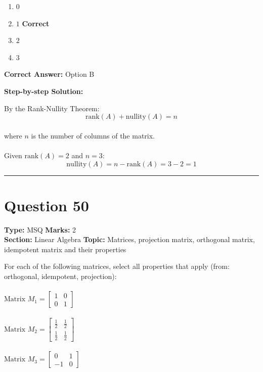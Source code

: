 \documentclass[11pt]{article}
\begin{document}
\begin{enumerate}[label=\textbf{\Alph*.}, leftmargin=1.8em]
\item \(0\)\item \(1\) \hfill {\color{gategreen}\textbf{Correct}}\item \(2\)\item \(3\)\end{enumerate}

\textbf{Correct Answer:} Option B

\textbf{Step-by-step Solution:}

By the Rank-Nullity Theorem:\\
\[\text{rank}(A) + \text{nullity}(A) = n\]\\
where \(n\) is the number of columns of the matrix.\\
\\
Given \(\text{rank}(A) = 2\) and \(n = 3\):\\
\[\text{nullity}(A) = n - \text{rank}(A) = 3 - 2 = 1\]

\vspace{0.8em}
\hrule
\vspace{0.4em}
\section*{Question 50}
\textbf{Type:} MSQ \hfill \textbf{Marks:} 2\\
\textbf{Section:} Linear Algebra \hfill \textbf{Topic:} Matrices, projection matrix, orthogonal matrix, idempotent matrix and their properties

For each of the following matrices, select all properties that apply (from: orthogonal, idempotent, projection):\\
\\
\(\text{Matrix } M_1 = \begin{bmatrix} 1 & 0 \\ 0 & 1 \end{bmatrix}\)\\
\\
\(\text{Matrix } M_2 = \begin{bmatrix} \frac{1}{2} & \frac{1}{2} \\ \frac{1}{2} & \frac{1}{2} \end{bmatrix}\)\\
\\
\(\text{Matrix } M_3 = \begin{bmatrix} 0 & 1 \\ -1 & 0 \end{bmatrix}\)
\end{document}
